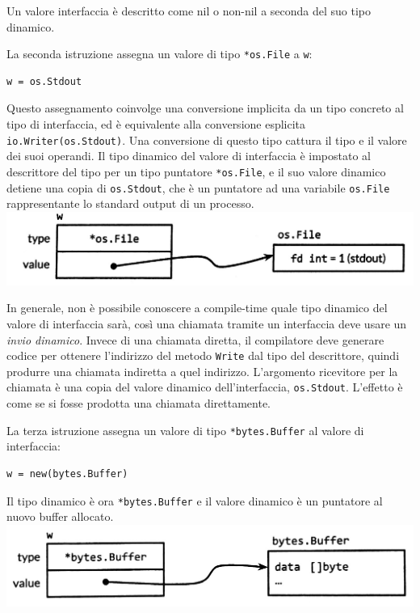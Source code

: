 \documentclass[../../thesis.tex]{subfiles}
\begin{document}
    \justifying\noindent Un valore interfaccia è descritto come nil o non-nil a seconda del suo tipo dinamico.
    \hfill \vspace{12pt}

    La seconda istruzione assegna un valore di tipo \verb"*os.File" a \verb"w":
    \begin{lstlisting}[frame = single, label = {lst:lstlisting6-5.3}]
w = os.Stdout
    \end{lstlisting}
    Questo assegnamento coinvolge una conversione implicita da un tipo concreto al tipo di interfaccia, ed è equivalente alla conversione esplicita \verb"io.Writer(os.Stdout)".
    Una conversione di questo tipo cattura il tipo e il valore dei suoi operandi.
    Il tipo dinamico del valore di interfaccia è impostato al descrittore del tipo per un tipo puntatore \verb"*os.File", e il suo valore dinamico detiene una copia di \verb"os.Stdout", che è un puntatore ad una variabile \verb"os.File" rappresentante lo standard output di un processo.
    \center\includegraphics[scale = 0.25]{figura-7.2}

    \justifying\noindent In generale, non è possibile conoscere a compile-time quale tipo dinamico del valore di interfaccia sarà, così una chiamata tramite un interfaccia deve usare un \textit{invio dinamico}.
    Invece di una chiamata diretta, il compilatore deve generare codice per ottenere l'indirizzo del metodo \verb"Write" dal tipo del descrittore, quindi produrre una chiamata indiretta a quel indirizzo.
    L'argomento ricevitore per la chiamata è una copia del valore dinamico dell'interfaccia, \verb"os.Stdout".
    L'effetto è come se si fosse prodotta una chiamata direttamente.
    \hfill \vspace{12pt}

    La terza istruzione assegna un valore di tipo \verb"*bytes.Buffer" al valore di interfaccia:
    \begin{lstlisting}[frame = single, label = {lst:lstlisting6-5.4}]
w = new(bytes.Buffer)
    \end{lstlisting}
    Il tipo dinamico è ora \verb"*bytes.Buffer" e il valore dinamico è un puntatore al nuovo buffer allocato.
    \center\includegraphics[scale = 0.25]{figura-7.3}
\end{document}
